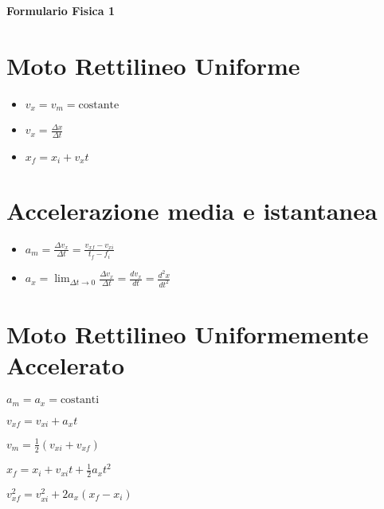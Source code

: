 \documentclass[a4paper,12pt,landscape]{article}
\title{}
\author{}
\date{}
\begin{document}
\begin{center}
    \vspace{1cm}
    \textbf{\Large Formulario Fisica 1}
    \vspace{1cm}
\end{center}

\begin{multicols*}{2}
    \section*{Moto Rettilineo Uniforme}
    \begin{itemize}
        \item $v_x = v_m = \text{costante}$
        \item $v_x = \frac{\Delta x}{\Delta t}$
        \item $x_f = x_i + v_x t$
    \end{itemize}

    \section*{Accelerazione media e istantanea}
    \begin{itemize}
        \item $a_m = \frac{\Delta v_x}{\Delta t} = \frac{v_{xf} - v_{xi}}{t_{f} - f_{i}}$
        \item $a_x = \displaystyle\lim_{\Delta t \to 0} \frac{\Delta v_x}{\Delta t} = \frac{dv_x}{dt} = \frac{d^2 x}{dt^2}$
    \end{itemize}

    \section*{Moto Rettilineo Uniformemente Accelerato}
    \begin{itemize}
        \begin{multicols*}{2}
            \item $a_m = a_x = \text{costanti}$
            \item $v_{xf} = v_{xi} + a_x t$
            \item $v_m = \tfrac{1}{2} (v_{xi} + v_{xf})$
            \item $x_f = x_i + v_{xi}t + \tfrac{1}{2} a_x t^2$
            \item $v^2_{xf} = v^2_{xi} + 2a_x(x_f - x_i)$
        \end{multicols*}
    \end{itemize}


\end{multicols*}
\end{document}
